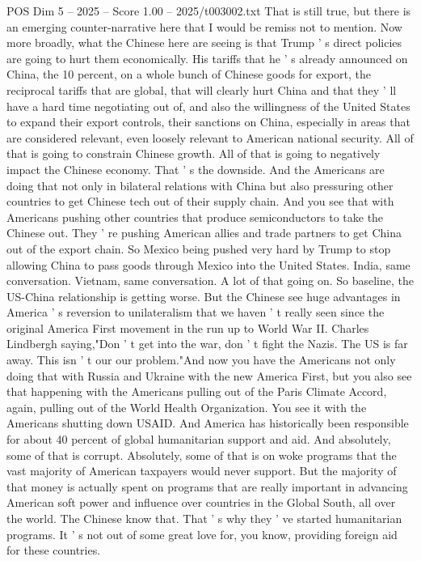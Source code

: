 \begin{textsample}{POS Dim 5 – 2025 – Score 1.00 – 2025/t003002.txt}
That is still true, but there is an emerging counter-narrative here that I would be remiss not to mention.
Now more broadly, what the Chinese here are seeing is that Trump ' s direct policies are going to hurt them economically.
His tariffs that he ' s already announced on China, the 10 percent, on a whole bunch of Chinese goods for export, the reciprocal tariffs that are global, that will clearly hurt China and that they ' ll have a hard time negotiating out of, and also the willingness of the United States to expand their export controls, their sanctions on China, especially in areas that are considered relevant, even loosely relevant to American national security.
All of that is going to constrain Chinese growth.
All of that is going to negatively impact the Chinese economy.
That ' s the downside.
And the Americans are doing that not only in bilateral relations with China but also pressuring other countries to get Chinese tech out of their supply chain.
And you see that with Americans pushing other countries that produce semiconductors to take the Chinese out.
They ' re pushing American allies and trade partners to get China out of the export chain.
So Mexico being pushed very hard by Trump to stop allowing China to pass goods through Mexico into the United States.
India, same conversation.
Vietnam, same conversation.
A lot of that going on.
So baseline, the US-China relationship is getting worse.
But the Chinese see huge advantages in America ' s reversion to unilateralism that we haven ' t really seen since the original America First movement in the run up to World War II.
Charles Lindbergh saying,"Don ' t get into the war, don ' t fight the Nazis.
The US is far away.
This isn ' t our our problem."And now you have the Americans not only doing that with Russia and Ukraine with the new America First, but you also see that happening with the Americans pulling out of the Paris Climate Accord, again, pulling out of the World Health Organization.
You see it with the Americans shutting down USAID.
And America has historically been responsible for about 40 percent of global humanitarian support and aid.
And absolutely, some of that is corrupt.
Absolutely, some of that is on woke programs that the vast majority of American taxpayers would never support.
But the majority of that money is actually spent on programs that are really important in advancing American soft power and influence over countries in the Global South, all over the world.
The Chinese know that.
That ' s why they ' ve started humanitarian programs.
It ' s not out of some great love for, you know, providing foreign aid for these countries.

\end{textsample}
